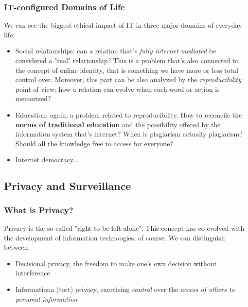 \documentclass{article}
\begin{document}
			\subsubsection{IT-configured Domains of Life}
				We can see the biggest ethical impact of IT in three major domains of everyday life:
				\begin{itemize}
					\item Social relationships: can a relation that's \textit{fully internet mediated} be considered a "real" relationship? This is a problem that's also connected to the concept of online identity, that is something we have more or less total control over. Moreover, this part can be also analyzed by the \textit{reproducibility} point of view: how a relation can evolve when each word or action is memorized?
		 			\item Education: again, a problem related to reproducibility. How to reconcile the \textbf{norms of traditional education} and the possibility offered by the information system that's internet? When is plagiarism actually plagiarism? Should all the knowledge free to access for everyone?
					\item Internet democracy...
				\end{itemize}

		\subsection{Privacy and Surveillance}
			\subsubsection{What is Privacy?}
				Privacy is the so-called "right to be left alone". This concept has co-evolved with the development of information technoogies, of course. We can distinguish between:
				\begin{itemize}
					\item Decisional privacy, the freedom to make one's own decision without interference
					\item Informationa (tort) privacy, exercising \textit{control} over the \textit{access of others to personal information}
				\end{itemize}
			
\end{document}
